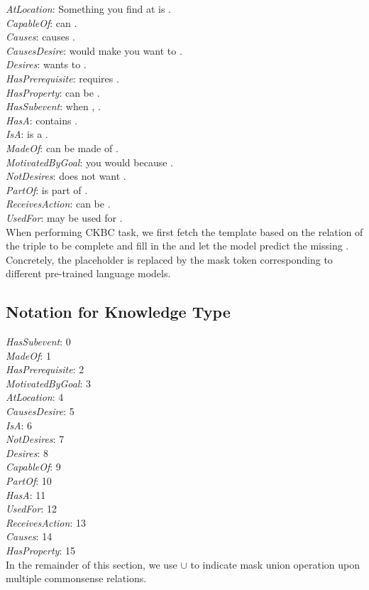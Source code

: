 \noindent
\textit{AtLocation}: Something you find at  is .  \\
\textit{CapableOf}:  can . \\
\textit{Causes}:  causes . \\
\textit{CausesDesire}:  would make you want to . \\
\textit{Desires}:  wants to . \\
\textit{HasPrerequisite}:  requires . \\
\textit{HasProperty}:  can be . \\
\textit{HasSubevent}: when , . \\
\textit{HasA}:  contains . \\
\textit{IsA}:  is a . \\
\textit{MadeOf}:  can be made of . \\
\textit{MotivatedByGoal}: you would  because . \\
\textit{NotDesires}:  does not want . \\
\textit{PartOf}:  is part of . \\
\textit{ReceivesAction}:  can be . \\
\textit{UsedFor}:  may be used for . \\
When performing CKBC task, we first fetch the template based on the relation of the triple to be complete and fill in the  and let the model predict the missing . Concretely, the  placeholder is 
replaced by the mask token corresponding to different pre-trained language models.


\subsection{Notation for Knowledge Type}
\textit{HasSubevent}: 0\\
\textit{MadeOf}: 1\\
\textit{HasPrerequisite}: 2\\
\textit{MotivatedByGoal}: 3\\
\textit{AtLocation}: 4\\
\textit{CausesDesire}: 5\\
\textit{IsA}: 6\\
\textit{NotDesires}: 7\\
\textit{Desires}: 8\\
\textit{CapableOf}: 9\\
\textit{PartOf}: 10\\
\textit{HasA}: 11\\
\textit{UsedFor}: 12\\
\textit{ReceivesAction}: 13\\
\textit{Causes}: 14\\
\textit{HasProperty}: 15\\
In the remainder of this section, we use $\cup$ to indicate mask union operation upon multiple commonsense relations.

